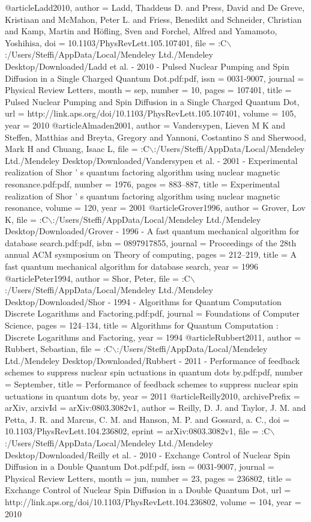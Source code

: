 @article{Ladd2010,
author = {Ladd, Thaddeus D. and Press, David and {De Greve}, Kristiaan and McMahon, Peter L. and Friess, Benedikt and Schneider, Christian and Kamp, Martin and H{\"{o}}fling, Sven and Forchel, Alfred and Yamamoto, Yoshihisa},
doi = {10.1103/PhysRevLett.105.107401},
file = {:C$\backslash$:/Users/Steffi/AppData/Local/Mendeley Ltd./Mendeley Desktop/Downloaded/Ladd et al. - 2010 - Pulsed Nuclear Pumping and Spin Diffusion in a Single Charged Quantum Dot.pdf:pdf},
issn = {0031-9007},
journal = {Physical Review Letters},
month = {sep},
number = {10},
pages = {107401},
title = {{Pulsed Nuclear Pumping and Spin Diffusion in a Single Charged Quantum Dot}},
url = {http://link.aps.org/doi/10.1103/PhysRevLett.105.107401},
volume = {105},
year = {2010}
}
@article{Almaden2001,
author = {Vandersypen, Lieven M K and Steffen, Matthias and Breyta, Gregory and Yannoni, Costantino S and Sherwood, Mark H and Chuang, Isaac L},
file = {:C$\backslash$:/Users/Steffi/AppData/Local/Mendeley Ltd./Mendeley Desktop/Downloaded/Vandersypen et al. - 2001 - Experimental realization of Shor ' s quantum factoring algorithm using nuclear magnetic resonance.pdf:pdf},
number = {1976},
pages = {883--887},
title = {{Experimental realization of Shor ' s quantum factoring algorithm using nuclear magnetic resonance}},
volume = {120},
year = {2001}
}
@article{Grover1996,
author = {Grover, Lov K},
file = {:C$\backslash$:/Users/Steffi/AppData/Local/Mendeley Ltd./Mendeley Desktop/Downloaded/Grover - 1996 - A fast quantum mechanical algorithm for database search.pdf:pdf},
isbn = {0897917855},
journal = {Proceedings of the 28th annual ACM sysmposium on Theory of computing},
pages = {212--219},
title = {{A fast quantum mechanical algorithm for database search}},
year = {1996}
}
@article{Peter1994,
author = {Shor, Peter},
file = {:C$\backslash$:/Users/Steffi/AppData/Local/Mendeley Ltd./Mendeley Desktop/Downloaded/Shor - 1994 - Algorithms for Quantum Computation Discrete Logarithms and Factoring.pdf:pdf},
journal = {Foundations of Computer Science},
pages = {124--134},
title = {{Algorithms for Quantum Computation : Discrete Logarithms and Factoring}},
year = {1994}
}
@article{Rubbert2011,
author = {Rubbert, Sebastian},
file = {:C$\backslash$:/Users/Steffi/AppData/Local/Mendeley Ltd./Mendeley Desktop/Downloaded/Rubbert - 2011 - Performance of feedback schemes to suppress nuclear spin uctuations in quantum dots by.pdf:pdf},
number = {September},
title = {{Performance of feedback schemes to suppress nuclear spin uctuations in quantum dots by}},
year = {2011}
}
@article{Reilly2010,
archivePrefix = {arXiv},
arxivId = {arXiv:0803.3082v1},
author = {Reilly, D. J. and Taylor, J. M. and Petta, J. R. and Marcus, C. M. and Hanson, M. P. and Gossard, a. C.},
doi = {10.1103/PhysRevLett.104.236802},
eprint = {arXiv:0803.3082v1},
file = {:C$\backslash$:/Users/Steffi/AppData/Local/Mendeley Ltd./Mendeley Desktop/Downloaded/Reilly et al. - 2010 - Exchange Control of Nuclear Spin Diffusion in a Double Quantum Dot.pdf:pdf},
issn = {0031-9007},
journal = {Physical Review Letters},
month = {jun},
number = {23},
pages = {236802},
title = {{Exchange Control of Nuclear Spin Diffusion in a Double Quantum Dot}},
url = {http://link.aps.org/doi/10.1103/PhysRevLett.104.236802},
volume = {104},
year = {2010}
}
